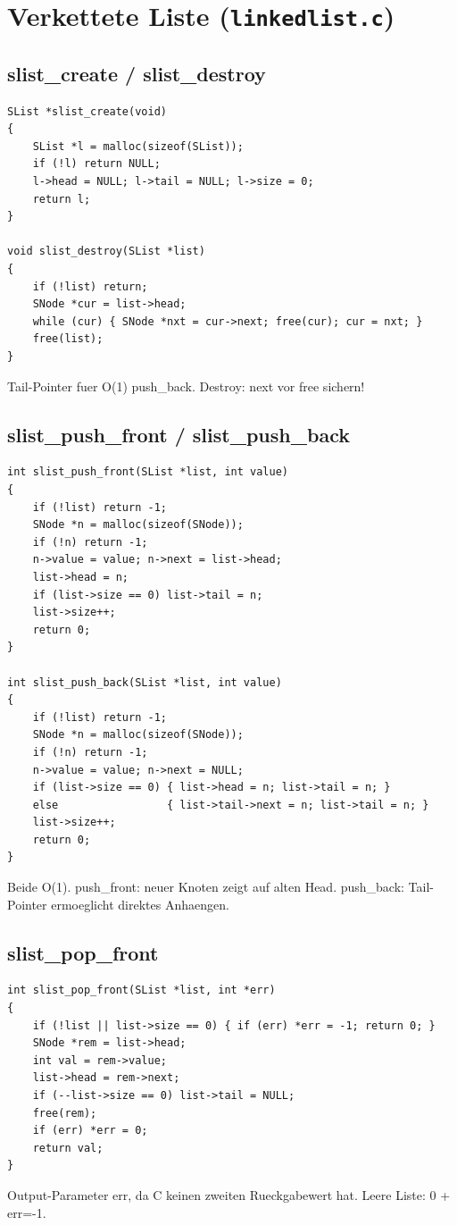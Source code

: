 \documentclass[10pt, a4paper]{article}
\begin{document}
\section{Verkettete Liste (\texttt{linkedlist.c})}

\subsection{slist\_create / slist\_destroy}
\begin{lstlisting}
SList *slist_create(void)
{
    SList *l = malloc(sizeof(SList));
    if (!l) return NULL;
    l->head = NULL; l->tail = NULL; l->size = 0;
    return l;
}

void slist_destroy(SList *list)
{
    if (!list) return;
    SNode *cur = list->head;
    while (cur) { SNode *nxt = cur->next; free(cur); cur = nxt; }
    free(list);
}
\end{lstlisting}
Tail-Pointer fuer O(1) push\_back. Destroy: next vor free sichern!

\subsection{slist\_push\_front / slist\_push\_back}
\begin{lstlisting}
int slist_push_front(SList *list, int value)
{
    if (!list) return -1;
    SNode *n = malloc(sizeof(SNode));
    if (!n) return -1;
    n->value = value; n->next = list->head;
    list->head = n;
    if (list->size == 0) list->tail = n;
    list->size++;
    return 0;
}

int slist_push_back(SList *list, int value)
{
    if (!list) return -1;
    SNode *n = malloc(sizeof(SNode));
    if (!n) return -1;
    n->value = value; n->next = NULL;
    if (list->size == 0) { list->head = n; list->tail = n; }
    else                 { list->tail->next = n; list->tail = n; }
    list->size++;
    return 0;
}
\end{lstlisting}
Beide O(1). push\_front: neuer Knoten zeigt auf alten Head. push\_back: Tail-Pointer ermoeglicht direktes Anhaengen.

\subsection{slist\_pop\_front}
\begin{lstlisting}
int slist_pop_front(SList *list, int *err)
{
    if (!list || list->size == 0) { if (err) *err = -1; return 0; }
    SNode *rem = list->head;
    int val = rem->value;
    list->head = rem->next;
    if (--list->size == 0) list->tail = NULL;
    free(rem);
    if (err) *err = 0;
    return val;
}
\end{lstlisting}
Output-Parameter err, da C keinen zweiten Rueckgabewert hat. Leere Liste: 0 + err=-1.
\end{document}
